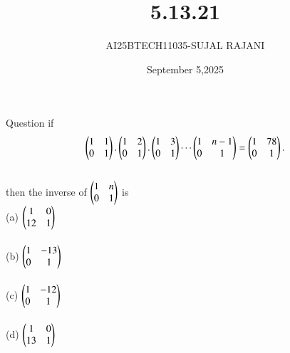 \documentclass{beamer}
\title %
{5.13.21}
\date{September 5,2025}
\author %
{AI25BTECH11035-SUJAL RAJANI}
\begin{document}
\frame{\titlepage}
\begin{frame}{Question}
if 
\begin{align*}
    \begin{pmatrix}1&1\\0&1\end{pmatrix}.\begin{pmatrix}1&2\\0&1\end{pmatrix}.\begin{pmatrix}1&3\\0&1\end{pmatrix}\cdots\begin{pmatrix}1&n-1\\0&1\end{pmatrix}=\begin{pmatrix}1&78\\0&1\end{pmatrix}.
\end{align*}
\\
then the inverse of $\begin{pmatrix}1&n\\0&1\end{pmatrix}$ is 
  \\
  (a) $\begin{pmatrix}1&0\\12&1\end{pmatrix}$
  \\
  \\
  (b) $\begin{pmatrix}1&-13\\0&1\end{pmatrix}$
  \\
  \\
  (c) $\begin{pmatrix}1&-12\\0&1\end{pmatrix}$
  \\
  \\
  (d) $\begin{pmatrix}1&0\\13&1\end{pmatrix}$
  \\
\end{frame}
\end{document}
